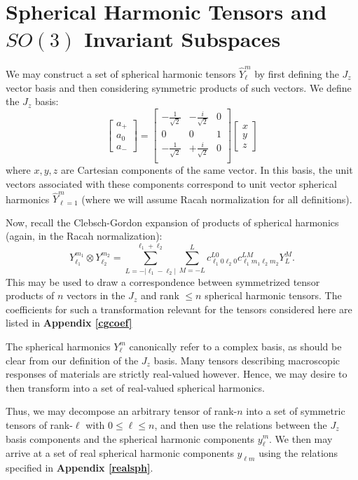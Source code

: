 \documentclass[10pt,a4paper]{article}
\begin{document}
\section{Spherical Harmonic Tensors and $SO(3)$ Invariant Subspaces}\label{so3inv}
We may construct a set of spherical harmonic tensors $\hat{Y}_{\ell}^m$ by first defining the $J_z$ vector basis and then considering symmetric products of such vectors. We define the $J_z$ basis:
$$
\begin{bmatrix}
a_+ \\
a_0 \\
a_-
\end{bmatrix}=\begin{bmatrix}
-\frac{1}{\sqrt{2}} & -\frac{i}{\sqrt{2}} & 0\\
 0 & 0 & 1\\
-\frac{1}{\sqrt{2}} & +\frac{i}{\sqrt{2}} & 0\\
\end{bmatrix}\begin{bmatrix}
x \\
y \\
z
\end{bmatrix}
$$
where $x,y,z$ are Cartesian components of the same vector. In this basis, the unit vectors associated with these components correspond to unit vector spherical harmonics $\hat{Y}_{\ell=1}^m$ (where we will assume Racah normalization for all definitions).

Now, recall the Clebsch-Gordon expansion of products of spherical harmonics (again, in the Racah normalization):
$$
Y_{\ell_1}^{m_1}\otimes Y_{\ell_2}^{m_2} = \sum_{L=-|\ell_1-\ell_2|}^{\ell_1+\ell_2}\sum_{M=-L}^{L}c_{\ell_1 0 \ell_2 0}^{L0}c_{\ell_1 m_1 \ell_2 m_2}^{LM}Y_{L}^M.
$$
This may be used to draw a correspondence between symmetrized tensor products of $n$ vectors in the $J_z$ and rank $\leq n$ spherical harmonic tensors. The coefficients for such a transformation relevant for the tensors considered here are listed in \textbf{Appendix \ref{cgcoef}}

The spherical harmonics $Y_{\ell}^m$ canonically refer to a complex basis, as should be clear from our definition of the $J_z$ basis. Many tensors describing macroscopic responses of materials are strictly real-valued however. Hence, we may desire to then transform into a set of real-valued spherical harmonics.

Thus, we may decompose an arbitrary tensor of rank-$n$ into a set of symmetric tensors of rank-$\ell$ with $0\leq\ell\leq n$, and then use the relations between the $J_z$ basis components and the spherical harmonic components $y_{\ell}^m$. We then may arrive at a set of real spherical harmonic components $y_{\ell m}$ using the relations specified in \textbf{Appendix \ref{realsph}}.
\end{document}
